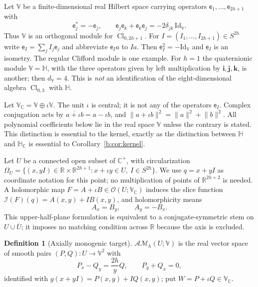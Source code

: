 \documentclass[11pt,a4paper]{article}
\numberwithin{equation}{section}
\theoremstyle{definition}
\newtheorem{definition}[theorem]{Definition}
\theoremstyle{remark}
\theoremstyle{plain}
\newcommand{\HH}{\mathbb H}
\newcommand{\HC}{\mathbb H_{\mathbb C}}
\newcommand{\RR}{\mathbb R}
\newcommand{\CC}{\mathbb C}
\newcommand{\Cplus}{\CC^{+}}
\newcommand{\I}{\mathcal I}
\newcommand{\AM}{\mathcal{AM}}
\newcommand{\Om}{\Omega}
\newcommand{\norm}[1]{\lVert #1\rVert}
\newcommand{\VV}{\mathbb V}                       %
\newcommand{\VC}{\mathbb V_{\CC}}                 %
\newcommand{\dV}{d_{\VV}}                         %
\begin{document}
Let $\VV$ be a finite-dimensional real Hilbert space carrying operators
$\mathsf e_1,\dots,\mathsf e_{2h+1}$ with
\begin{equation}\label{g:eq:clifford}
 \mathsf e_j^*=-\mathsf e_j,\qquad
 \mathsf e_j\mathsf e_k+\mathsf e_k\mathsf e_j=-2\delta_{jk}\,\mathrm{Id}_{\VV}.
\end{equation}
Thus $\VV$ is an orthogonal module for $\operatorname{Cl}_{0,2h+1}$. For
$I=(I_1,\dots,I_{2h+1})\in S^{2h}$ write $\mathsf e_I=\sum_jI_j\mathsf e_j$ and
abbreviate $\mathsf e_Ia$ to $Ia$. Then $\mathsf e_I^2=-\mathrm{Id}_{\VV}$ and
$\mathsf e_I$ is an isometry. The regular Clifford module is one example. For
$h=1$ the quaternionic module $\VV=\HH$, with the three operators given by left
multiplication by $\mathbf i,\mathbf j,\mathbf k$, is another; then $\dV=4$.
This is \emph{not} an identification of the eight-dimensional algebra
$\operatorname{Cl}_{0,3}$ with $\HH$.

Let $\VC=\VV\oplus\iota\VV$. The unit $\iota$ is central; it is not any of the
operators $\mathsf e_I$. Complex conjugation acts by
$\overline{a+\iota b}=a-\iota b$, and $\norm{a+\iota b}^2=\norm a^2+\norm b^2$.
All polynomial coefficients below lie in the real space $\VV$ unless the
contrary is stated. This distinction is essential to the kernel, exactly as
the distinction between $\HH$ and $\HC$ is essential to
Corollary~\ref{b:cor:kernel}.

Let $U$ be a connected open subset of $\Cplus$, with circularization
$\Om_U=\{(x,yI)\in\RR\times\RR^{2h+1}:x+\iota y\in U,\ I\in S^{2h}\}$. We use
$q=x+yI$ as coordinate notation for this point; no multiplication of points of
$\RR^{2h+2}$ is needed. A holomorphic map $F=A+\iota B\in\mathcal O(U;\VC)$
induces the slice function $\I(F)(q)=A(x,y)+IB(x,y)$, and holomorphicity means
\begin{equation}\label{g:eq:CR}
 A_x=B_y,\qquad A_y=-B_x.
\end{equation}
This upper-half-plane formulation is equivalent to a conjugate-symmetric stem
on $U\cup\overline U$; it imposes no matching condition across $\RR$ because
the axis is excluded.

\begin{definition}[Axially monogenic target]
\label{g:def:AM}
$\AM_h(U;\VV)$ is the real vector space of smooth pairs $(P,Q):U\to\VV^2$ with
\begin{equation}\label{g:eq:vekua}
 P_x-Q_y=\frac{2h}{y}Q,\qquad P_y+Q_x=0,
\end{equation}
identified with $g(x+yI)=P(x,y)+IQ(x,y)$; put $W=P+\iota Q\in\VC$.
\end{definition}
\end{document}
